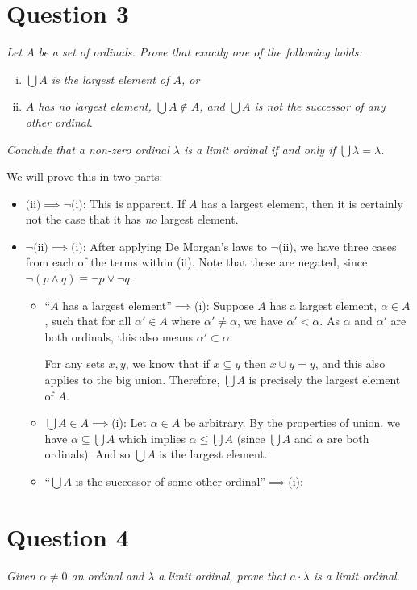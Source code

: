 \documentclass[a4paper]{article}
\begin{document}
\section*{Question 3}
\begin{flushleft}
  \textit{Let $A$ be a set of ordinals. Prove that exactly one of the following holds:}
  \begin{enumerate}[(i)]
    \item \textit{$\bigcup A$ is the largest element of $A$, or}
    \item \textit{$A$ has no largest element, $\bigcup A \notin A$, and 
      $\bigcup A$ is not the successor of any other ordinal.}
  \end{enumerate}
  \textit{Conclude that a non-zero ordinal $\lambda$ is a limit ordinal if and only if
  $\bigcup \lambda = \lambda$.}
\end{flushleft}
We will prove this in two parts:
\begin{itemize}
  \item $\text{(ii)} \implies \neg\text{(i)}$:
    This is apparent. If $A$ has a largest element, then it is certainly not the case that it has \textit{no} largest element.
  \item $\neg\text{(ii)} \implies \text{(i)}$:
    After applying De Morgan's laws to $\neg$(ii), we have three cases from each of the terms within (ii).
    Note that these are negated, since $\neg(p \wedge q) \equiv \neg p \vee \neg q$.
    \begin{itemize}
      \item ``$A$ has a largest element''$ \implies $(i):
        Suppose $A$ has a largest element, $\alpha \in A$,
        such that for all $\alpha' \in A$ where $\alpha' \ne \alpha$,
        we have $\alpha' < \alpha$.
        As $\alpha$ and $\alpha'$ are both ordinals, 
        this also means $\alpha' \subset \alpha$.

        For any sets $x,y$, we know that if $x \subseteq y$ then $x \cup y = y$,
        and this also applies to the big union.
        Therefore, $\bigcup A$ is precisely the largest element of $A$.

      \item $\bigcup A \in A \implies $(i):
        Let $\alpha \in A$ be arbitrary. By the properties of union,
        we have $\alpha \subseteq \bigcup A$ which implies $\alpha \le \bigcup A$
        (since $\bigcup A$ and $\alpha$ are both ordinals).
        And so $\bigcup A$ is the largest element.
      \item ``$\bigcup A$ is the successor of some other ordinal''$ \implies $(i):
    \end{itemize}
\end{itemize}



\section*{Question 4}
\begin{center}
  \textit{Given $\alpha \ne 0$ an ordinal and $\lambda$ a limit ordinal,
  prove that $a \cdot \lambda$ is a limit ordinal.}
\end{center}
\end{document}
